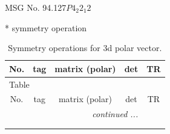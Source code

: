 \documentclass[fleqn,8pt]{jsarticle}
\begin{document}
\setcounter{MaxMatrixCols}{32}

\renewcommand{\tablename}{Table~}
\renewcommand{\figurename}{Figure~}
\begin{center}
\LARGE
MSG No. 94.127\quad$P4_{2}2_{1}2$
\end{center}
* symmetry operation
\renewcommand{\arraystretch}{1.3}
\begin{longtable}{ccccc}
\caption{Symmetry operations for 3d polar vector.}
 \\
 \hline \hline
No. & tag & matrix (polar) & det & TR \\ \hline \endfirsthead

\multicolumn{4}{l}{\tablename\ \thetable{}} \\
 \hline \hline
No. & tag & matrix (polar) & det & TR \\ \hline \endhead

 \hline \hline
\multicolumn{4}{r}{\footnotesize\it continued ...} \\ \endfoot

 \hline \hline
\multicolumn{4}{r}{} \\ \endlastfoot


\end{longtable}
\end{document}
